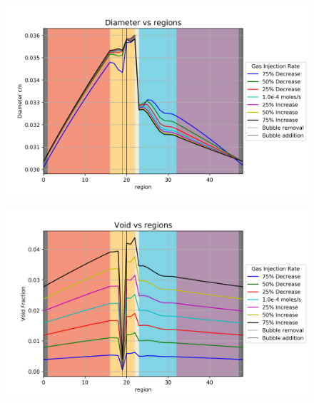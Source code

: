 \begin{figure}[p] 
\centering
\begin{minipage}{.5\textwidth}
  \centering
  \includegraphics[width=1.0\linewidth]{images/RateDiameter.png}
  \label{fig:RateDia}
\end{minipage}%
\begin{minipage}{.5\textwidth}
  \centering
  \includegraphics[width=1.0\linewidth]{images/RateVoid.png}
  \label{fig:RateVoid}
\end{minipage}
\end{figure}

